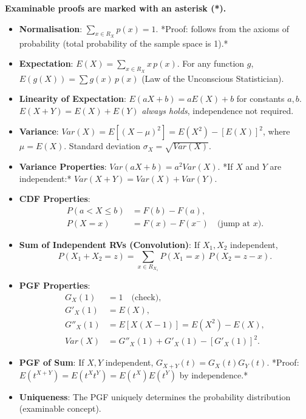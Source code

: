 \documentclass[11pt]{article}
\begin{document}
\begin{propriete}
\textbf{Examinable proofs are marked with an asterisk (*).}
\begin{itemize}
    \item \textbf{Normalisation}: $\sum_{x \in R_X} p(x) = 1$. *Proof: follows from the axioms of probability (total probability of the sample space is 1).*
    \item \textbf{Expectation}: $E(X) = \sum_{x \in R_X} x\,p(x)$. For any function $g$, $E(g(X)) = \sum g(x)\,p(x)$ (Law of the Unconscious Statistician).
    \item \textbf{Linearity of Expectation}: $E(aX+b) = aE(X)+b$ for constants $a,b$. $E(X+Y) = E(X)+E(Y)$ \emph{always holds}, independence not required.
    \item \textbf{Variance}: $Var(X) = E[(X-\mu)^2] = E(X^2) - [E(X)]^2$, where $\mu = E(X)$. Standard deviation $\sigma_X = \sqrt{Var(X)}$.
    \item \textbf{Variance Properties}: $Var(aX+b) = a^2 Var(X)$. *If $X$ and $Y$ are independent:* $Var(X+Y) = Var(X)+Var(Y)$.
    \item \textbf{CDF Properties}:
          \begin{align*}
              P(a < X \le b) &= F(b) - F(a), \\
              P(X = x) &= F(x) - F(x^-) \quad \text{(jump at $x$)}.
          \end{align*}
    \item \textbf{Sum of Independent RVs (Convolution)}: If $X_1, X_2$ independent,
          \[
              P(X_1+X_2 = z) = \sum_{x \in R_{X_1}} P(X_1=x)\,P(X_2=z-x).
          \]
    \item \textbf{PGF Properties}:
          \begin{align*}
              G_X(1) &= 1 \quad \text{(check)}, \\
              G'_X(1) &= E(X), \\
              G''_X(1) &= E[X(X-1)] = E(X^2) - E(X), \\
              Var(X) &= G''_X(1) + G'_X(1) - [G'_X(1)]^2.
          \end{align*}
    \item \textbf{PGF of Sum}: If $X,Y$ independent, $G_{X+Y}(t) = G_X(t) G_Y(t)$. *Proof: $E(t^{X+Y}) = E(t^X t^Y) = E(t^X)E(t^Y)$ by independence.*
    \item \textbf{Uniqueness}: The PGF uniquely determines the probability distribution (examinable concept).
\end{itemize}
\end{propriete}
\end{document}
